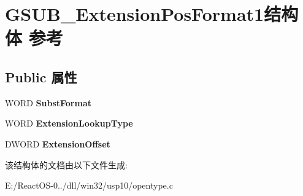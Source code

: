 \hypertarget{struct_g_s_u_b___extension_pos_format1}{}\section{G\+S\+U\+B\+\_\+\+Extension\+Pos\+Format1结构体 参考}
\label{struct_g_s_u_b___extension_pos_format1}
\subsection*{Public 属性}
\begin{DoxyCompactItemize}
\item 
\mbox{\label{struct_g_s_u_b___extension_pos_format1_a4176dc70a2fa2dc451a8581f781b88c2}} 
W\+O\+RD {\bfseries Subst\+Format}
\item 
\mbox{\label{struct_g_s_u_b___extension_pos_format1_ae4c3ce71b3544ca37b38c7aef5c73b5d}} 
W\+O\+RD {\bfseries Extension\+Lookup\+Type}
\item 
\mbox{\label{struct_g_s_u_b___extension_pos_format1_a5c644e10db72cdb2c3f334a534875cb1}} 
D\+W\+O\+RD {\bfseries Extension\+Offset}
\end{DoxyCompactItemize}


该结构体的文档由以下文件生成\+:\begin{DoxyCompactItemize}
\item 
E\+:/\+React\+O\+S-\/0../dll/win32/usp10/opentype.\+c\end{DoxyCompactItemize}

